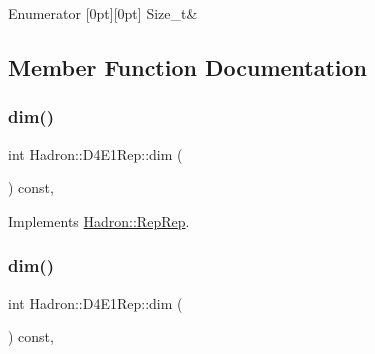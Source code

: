 \begin{DoxyEnumFields}{Enumerator}
[0pt][0pt]{}\mbox{\label{structHadron_1_1D4E1Rep_ac8c94c08d3ac7ac313a46c1c5c61919ba5a5bf56aa9c80673f52ab509934901f7}} 
Size\+\_\+t&\\
\hline

\end{DoxyEnumFields}


\subsection{Member Function Documentation}
\mbox{\label{structHadron_1_1D4E1Rep_a4e11b2eaec3c949ef3d8b7c391078e84}} 
\subsubsection{\texorpdfstring{dim()}{dim()}\hspace{0.1cm}{\footnotesize\ttfamily [1/3]}}
{\footnotesize\ttfamily int Hadron\+::\+D4\+E1\+Rep\+::dim (\begin{DoxyParamCaption}{ }\end{DoxyParamCaption}) const\hspace{0.3cm}{\ttfamily [inline]}, {\ttfamily [virtual]}}



Implements \mbox{\hyperlink{structHadron_1_1RepRep_a92c8802e5ed7afd7da43ccfd5b7cd92b}{Hadron\+::\+Rep\+Rep}}.

\mbox{\label{structHadron_1_1D4E1Rep_a4e11b2eaec3c949ef3d8b7c391078e84}} 
\subsubsection{\texorpdfstring{dim()}{dim()}\hspace{0.1cm}{\footnotesize\ttfamily [2/3]}}
{\footnotesize\ttfamily int Hadron\+::\+D4\+E1\+Rep\+::dim (\begin{DoxyParamCaption}{ }\end{DoxyParamCaption}) const\hspace{0.3cm}{\ttfamily [inline]}, {\ttfamily [virtual]}}



